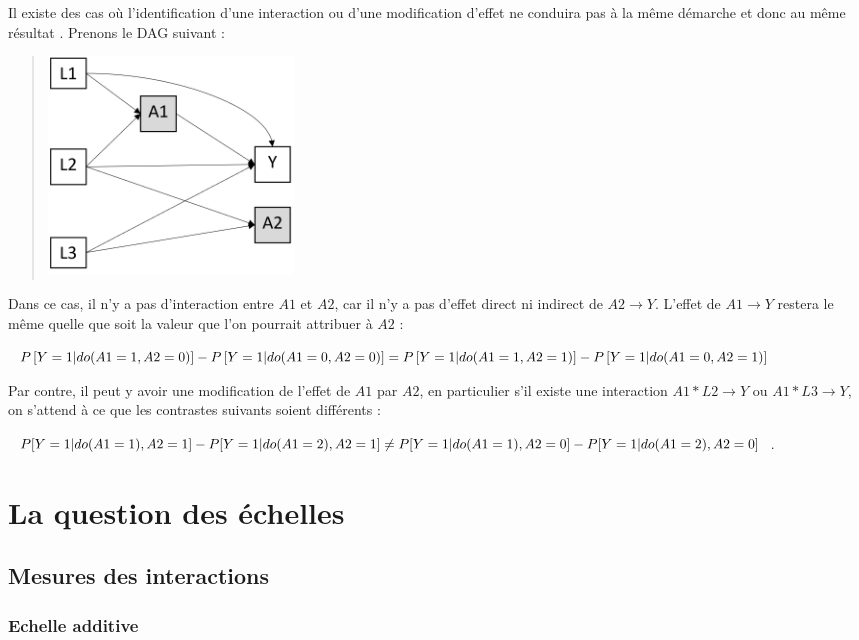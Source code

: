 \documentclass[
]{book}
\begin{document}
Il existe des cas où l'identification d'une interaction ou d'une modification d'effet ne conduira pas à la même démarche et donc au même résultat \citet{vanderweele_distinction_2009}. Prenons le DAG suivant :

\begin{quote}
\includegraphics[width=0.3\textwidth,height=\textheight]{img/Image12.png}
\end{quote}

Dans ce cas, il n'y a pas d'interaction entre \(A1\) et \(A2\), car il n'y a pas d'effet direct ni indirect de \(A2 \rightarrow Y\). L'effet de \(A1 \rightarrow Y\) restera le même quelle que soit la valeur que l'on pourrait attribuer à \(A2\) :

\(\scriptsize P\left[Y=1|do(A1=1, A2=0)\right] - P\left[Y=1|do(A1=0, A2=0)\right] = P\left[Y=1|do(A1=1, A2=1)\right] - P\left[Y=1|do(A1=0, A2=1)\right]\)

Par contre, il peut y avoir une modification de l'effet de \(A1\) par \(A2\), en particulier s'il existe une interaction \(A1 * L2 \rightarrow Y\) ou \(A1 * L3 \rightarrow Y\), on s'attend à ce que les contrastes suivants soient différents :

\(\scriptsize P[Y=1|do(A1=1),A2=1] - P[Y=1|do(A1=2),A2=1] \neq P[Y=1|do(A1=1),A2=0] - P[Y=1|do(A1=2),A2=0]\).

\hypertarget{echelle}{%
\chapter{La question des échelles}\label{echelle}}

\hypertarget{mesures-des-interactions}{%
\section{Mesures des interactions}\label{mesures-des-interactions}}

\hypertarget{echelle-additive}{%
\subsection*{Echelle additive}\label{echelle-additive}}
\end{document}
